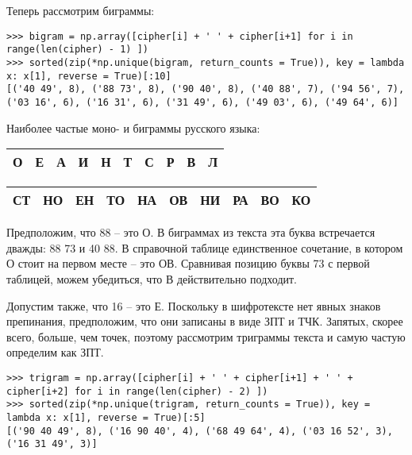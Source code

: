 \documentclass[letterpaper,11pt,openany]{book}
\begin{document}
Теперь рассмотрим биграммы:

\begin{lstlisting}
>>> bigram = np.array([cipher[i] + ' ' + cipher[i+1] for i in range(len(cipher) - 1) ])
>>> sorted(zip(*np.unique(bigram, return_counts = True)), key = lambda x: x[1], reverse = True)[:10]
[('40 49', 8), ('88 73', 8), ('90 40', 8), ('40 88', 7), ('94 56', 7), ('03 16', 6), ('16 31', 6), ('31 49', 6), ('49 03', 6), ('49 64', 6)]
\end{lstlisting}

Наиболее частые моно- и биграммы русского языка:

\medskip

{\centering
\begin{tabular}{||c|c|c|c|c|c|c|c|c|c||}
\hline
\textbf{О} & \textbf{Е} & \textbf{А} & \textbf{И} & \textbf{Н} & \textbf{Т} & \textbf{С} & \textbf{Р} & \textbf{В} & \textbf{Л} \\
\hline
\end{tabular}

}

\medskip

{\centering
\begin{tabular}{||c|c|c|c|c|c|c|c|c|c||}
\hline
\textbf{СТ} & \textbf{НО} & \textbf{ЕН} & \textbf{ТО} & \textbf{НА} & \textbf{ОВ} & \textbf{НИ} & \textbf{РА} & \textbf{ВО} & \textbf{КО} \\
\hline
\end{tabular}

}

\medskip


\medskip

Предположим, что 88 -- это О. В биграммах из текста эта буква встречается дважды: 88 73 и 40 88. В справочной таблице единственное сочетание, в котором О стоит на первом месте -- это ОВ. Сравнивая позицию буквы 73 с первой таблицей, можем убедиться, что В действительно подходит. 

Допустим также, что 16 -- это Е. Поскольку в шифротексте нет явных знаков препинания, предположим, что они записаны в виде ЗПТ и ТЧК. Запятых, скорее всего, больше, чем точек, поэтому рассмотрим триграммы текста и самую частую определим как ЗПТ.

\begin{lstlisting}
>>> trigram = np.array([cipher[i] + ' ' + cipher[i+1] + ' ' + cipher[i+2] for i in range(len(cipher) - 2) ])
>>> sorted(zip(*np.unique(trigram, return_counts = True)), key = lambda x: x[1], reverse = True)[:5]
[('90 40 49', 8), ('16 90 40', 4), ('68 49 64', 4), ('03 16 52', 3), ('16 31 49', 3)]
\end{lstlisting}
\end{document}
